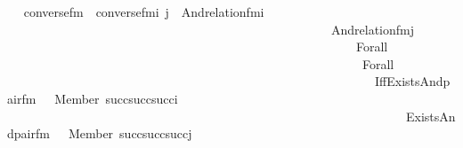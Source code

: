 \begin{isabellebody}
\endisatagproof
{\isafoldproof}%
%
\isadelimproof
\ \isanewline
%
\endisadelimproof
\isanewline
{}\isamarkupfalse%
\ converse{\isacharunderscore}{\kern0pt}fm\ \ {\isachardoublequoteopen}converse{\isacharunderscore}{\kern0pt}fm{\isacharparenleft}{\kern0pt}i{\isacharcomma}{\kern0pt}\ j{\isacharparenright}{\kern0pt}\ {\isasymequiv}\ And{\isacharparenleft}{\kern0pt}relation{\isacharunderscore}{\kern0pt}fm{\isacharparenleft}{\kern0pt}i{\isacharparenright}{\kern0pt}{\isacharcomma}{\kern0pt}\isanewline
\ \ \ \ \ \ \ \ \ \ \ \ \ \ \ \ \ \ \ \ \ \ \ \ \ \ \ \ \ \ \ \ \ \ \ \ \ \ \ \ \ \ \ \ \ \ \ \ \ \ \ \ And{\isacharparenleft}{\kern0pt}relation{\isacharunderscore}{\kern0pt}fm{\isacharparenleft}{\kern0pt}j{\isacharparenright}{\kern0pt}{\isacharcomma}{\kern0pt}\isanewline
\ \ \ \ \ \ \ \ \ \ \ \ \ \ \ \ \ \ \ \ \ \ \ \ \ \ \ \ \ \ \ \ \ \ \ \ \ \ \ \ \ \ \ \ \ \ \ \ \ \ \ \ \ \ \ \ Forall\isanewline
\ \ \ \ \ \ \ \ \ \ \ \ \ \ \ \ \ \ \ \ \ \ \ \ \ \ \ \ \ \ \ \ \ \ \ \ \ \ \ \ \ \ \ \ \ \ \ \ \ \ \ \ \ \ \ \ \ {\isacharparenleft}{\kern0pt}Forall\isanewline
\ \ \ \ \ \ \ \ \ \ \ \ \ \ \ \ \ \ \ \ \ \ \ \ \ \ \ \ \ \ \ \ \ \ \ \ \ \ \ \ \ \ \ \ \ \ \ \ \ \ \ \ \ \ \ \ \ \ \ {\isacharparenleft}{\kern0pt}Iff{\isacharparenleft}{\kern0pt}Exists{\isacharparenleft}{\kern0pt}And{\isacharparenleft}{\kern0pt}pair{\isacharunderscore}{\kern0pt}fm{\isacharparenleft}{\kern0pt}{}{\isacharcomma}{\kern0pt}\ {}{\isacharcomma}{\kern0pt}\ {}{\isacharparenright}{\kern0pt}{\isacharcomma}{\kern0pt}\ Member{\isacharparenleft}{\kern0pt}{}{\isacharcomma}{\kern0pt}\ succ{\isacharparenleft}{\kern0pt}succ{\isacharparenleft}{\kern0pt}succ{\isacharparenleft}{\kern0pt}i{\isacharparenright}{\kern0pt}{\isacharparenright}{\kern0pt}{\isacharparenright}{\kern0pt}{\isacharparenright}{\kern0pt}{\isacharparenright}{\kern0pt}{\isacharparenright}{\kern0pt}{\isacharcomma}{\kern0pt}\isanewline
\ \ \ \ \ \ \ \ \ \ \ \ \ \ \ \ \ \ \ \ \ \ \ \ \ \ \ \ \ \ \ \ \ \ \ \ \ \ \ \ \ \ \ \ \ \ \ \ \ \ \ \ \ \ \ \ \ \ \ \ \ \ \ \ Exists{\isacharparenleft}{\kern0pt}And{\isacharparenleft}{\kern0pt}pair{\isacharunderscore}{\kern0pt}fm{\isacharparenleft}{\kern0pt}{}{\isacharcomma}{\kern0pt}\ {}{\isacharcomma}{\kern0pt}\ {}{\isacharparenright}{\kern0pt}{\isacharcomma}{\kern0pt}\ Member{\isacharparenleft}{\kern0pt}{}{\isacharcomma}{\kern0pt}\ succ{\isacharparenleft}{\kern0pt}succ{\isacharparenleft}{\kern0pt}succ{\isacharparenleft}{\kern0pt}j{\isacharparenright}{\kern0pt}{\isacharparenright}{\kern0pt}{\isacharparenright}{\kern0pt}{\isacharparenright}{\kern0pt}{\isacharparenright}{\kern0pt}{\isacharparenright}{\kern0pt}{\isacharparenright}{\kern0pt}{\isacharparenright}{\kern0pt}{\isacharparenright}{\kern0pt}{\isacharparenright}{\kern0pt}{\isacharparenright}{\kern0pt}\ {\isachardoublequoteclose}\isanewline

\end{isabellebody}
